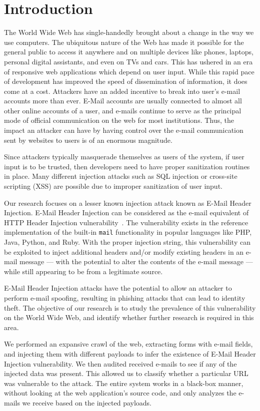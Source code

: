 \section{Introduction}
	The World Wide Web has single-handedly brought about a change in the way we use computers. The ubiquitous nature of the Web has made it possible for the general public to access it anywhere and on multiple devices like phones, laptops, personal digital assistants, and even on TVs and cars. This has ushered in an era of responsive web applications which depend on user input. While this rapid pace of development has improved the speed of dissemination of information, it does come at a cost. Attackers have an added incentive to break into user's e-mail accounts more than ever. E-Mail accounts are usually connected to almost all other online accounts of a user, and e-mails continue to serve as the principal mode of official communication on the web for most institutions. Thus, the impact an attacker can have by having control over the e-mail communication sent by websites to users is of an enormous magnitude. 
	
	Since attackers typically masquerade themselves as users of the system, if user input is to be trusted, then developers need to have proper sanitization routines in place. Many different injection attacks such as SQL injection or cross-site scripting (XSS) \cite{OWASPT10} are possible due to improper sanitization of user input. 
	
	Our research focuses on a lesser known injection attack known as E-Mail Header Injection. E-Mail Header Injection can be considered as the e-mail equivalent of HTTP Header Injection vulnerability~\cite{wiki:HTTP_headerinjection}. The vulnerability exists in the reference implementation of the built-in \texttt{mail} functionality in popular languages like PHP, Java, Python, and Ruby. With the proper injection string, this vulnerability can be exploited to inject additional headers and/or modify existing headers in an e-mail message --- with the potential to alter the contents of the e-mail message --- while still appearing to be from a legitimate source.
	
	E-Mail Header Injection attacks have the potential to allow an attacker to perform e-mail spoofing, resulting in phishing attacks that can lead to identity theft.
	The objective of our research is to study the prevalence of this vulnerability on the World Wide Web, and identify whether further research is required in this area.
	
	We performed an expansive crawl of the web, extracting forms with e-mail fields, and injecting them with different payloads to infer the existence of E-Mail Header Injection vulnerability. We then audited received e-mails to see if any of the injected data was present. This allowed us to classify whether a particular URL was vulnerable to the attack. The entire system works in a black-box manner, without looking at the web application's source code, and only analyzes the e-mails we receive based on the injected payloads.

